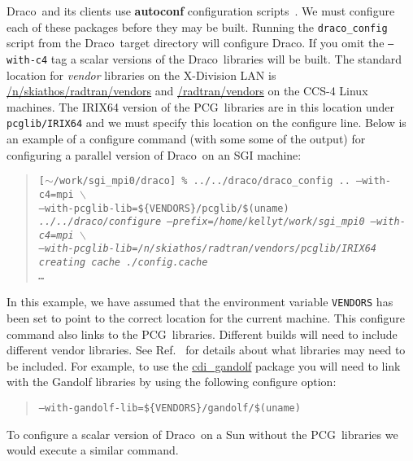 \documentclass[10pt]{nmemo}
\newcommand{\comp}[1]{\normalfont\normalsize\texttt{#1}}
\newcommand{\draco}{{\normalfont\sffamily Draco}}
\newcommand{\pcg}{{\normalfont\sffamily PCG}}
\begin{document}
\draco\ and its clients use \textbf{autoconf} configuration
scripts~\cite{autoconf}.  We must configure each of these packages
before they may be built.  Running the \comp{draco\_config} script
from the \draco\ target directory will configure \draco.  If you omit
the \comp{--with-c4} tag a scalar versions of the \draco\ libraries
will be built.  The standard location for \emph{vendor} libraries on
the X-Division LAN is \url{/n/skiathos/radtran/vendors} and
\url{/radtran/vendors} on the CCS-4 Linux machines.  The IRIX64
version of the \pcg\ libraries are in this location under
\comp{pcglib/IRIX64} and we must specify this location on the
configure line.  Below is an example of a configure command (with some
some of the output) for configuring a parallel version of \draco\ on
an SGI machine:  

\footnotesize
\begin{verse}
\texttt{[$\sim$/work/sgi\_mpi0/draco] \% ../../draco/draco\_config .. --with-c4=mpi $\backslash$\\
\hspace{0.5in}--with-pcglib-lib=\$\{VENDORS\}/pcglib/\$(uname) \\
\emph{../../draco/configure --prefix=/home/kellyt/work/sgi\_mpi0 --with-c4=mpi $\backslash$\\
\hspace{0.5in}--with-pcglib-lib=/n/skiathos/radtran/vendors/pcglib/IRIX64\\
creating cache ./config.cache\\
\hspace{1.0in} \ldots }}
\end{verse}
\normalsize

In this example, we have assumed that the environment variable
\comp{VENDORS} has been set to point to the correct location for the
current machine. This configure command also links to the \pcg\ 
libraries.  Different builds will need to include different vendor
libraries.  See Ref.~\cite{draco-build} for details about what
libraries may need to be included.  For example, to use the
\url{cdi_gandolf} package you will need to link with the Gandolf
libraries by using the following configure option:

\footnotesize
\begin{verse}
\texttt{--with-gandolf-lib=\$\{VENDORS\}/gandolf/\$(uname)}
\end{verse}
\normalsize

To configure a scalar version of \draco\ on a Sun without the \pcg\ 
libraries we would execute a similar command.
\end{document}

